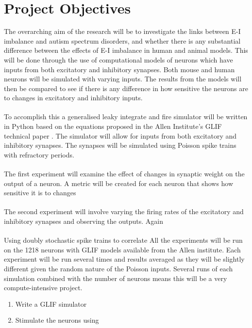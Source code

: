 \documentclass{epsrc}
\begin{document}
\section{Project Objectives}
\noindent
The overarching aim of the research will be to investigate the links between E-I imbalance and autism spectrum disorders, and whether there is any substantial difference between the effects of E-I imbalance in human and animal models. This will be done through the use of computational models of neurons which have inputs from both excitatory and inhibitory synapses. Both mouse and human neurons will be simulated with varying inputs. The results from the models will then be compared to see if there is any difference in how sensitive the neurons are to changes in excitatory and inhibitory inputs. 
\\\\
To accomplish this a generalised leaky integrate and fire simulator will be written in Python based on the equations proposed in the Allen Institute's GLIF technical paper \cite{allen2017GLIF}. The simulator will allow for inputs from both excitatory and inhibitory synapses. The synapses will be simulated using Poisson spike trains with refractory periods. 
\\\\
The first experiment will examine the effect of changes in synaptic weight on the output of a neuron. A metric will be created for each neuron that shows how sensitive it is to changes  
\\\\
The second experiment will involve varying the firing rates of the excitatory and inhibitory synapses and observing the outputs. Again 
\\\\
Using doubly stochastic spike trains to correlate
All the experiments will be run on the 1218 neurons with GLIF models available from the Allen institute. Each experiment will be run several times and results averaged as they will be slightly different given the random nature of the Poisson inputs. Several runs of each simulation combined with the number of neurons means this will be a very compute-intensive project.

\begin{enumerate}[label=\bfseries Work package \arabic*:, align=left]
	\item Write a GLIF simulator 
	\item Stimulate the neurons using 
	
\end{enumerate}
\end{document}
